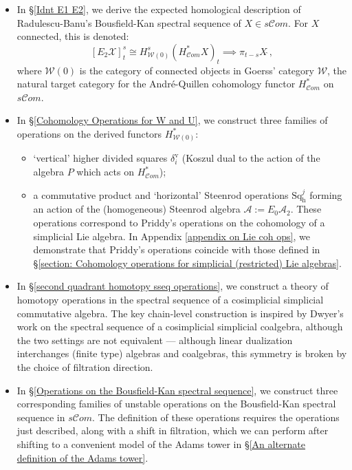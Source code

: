 \documentclass[11pt]{amsart} \renewcommand{\baselinestretch}{1.4}
\theoremstyle{plain}
\theoremstyle{definition}
\newcommand{\scrC}{\mathscr{C}}
\newcommand{\calA}{\mathcal{A}}
\newcommand{\calw}{\mathcal{W}}
\newcommand{\cala}{\mathcal{A}}
\newcommand{\calx}{\mathcal{X}}
\newcommand{\LieSteen}{\calA}
\newcommand{\algs}{{\scrC\!\textit{om}}}
\newcommand{\E}[5]{[E^{#1}_{#2}#3]^{#4}_{#5}}
\newcommand{\uver}{^\mathrm{v}}
\newcommand{\dhor}{_\mathrm{h}}
\newcommand{\Sqh}{\mathrm{Sq}\dhor}
\newcommand{\deltav}{\delta\uver}
\begin{document}
\begin{Introduction}
\begin{itemize}
\item In \S\ref{Idnt E1 E2}, we derive the expected homological description of Radulescu-Banu's Bousfield-Kan spectral sequence of $X\in s\algs$. For $X$ connected, this is denoted:
\[\E{}{2}{\calx}{s}{t}\cong H^{s}_{\calw(0)}(H^{*}_{\algs}X)_t\implies \pi_{t-s}X\hat{\ },\]
where $\calw(0)$ is the category of connected objects in Goerss' category $\calw$, the natural target category for the Andr\'e-Quillen cohomology functor $H^*_\algs$ on $s\algs$.
\item In \S\ref{Cohomology Operations for W and U}, we construct three families of operations on the derived functors $H^*_{\calw(0)}$:
\begin{itemize}
\item `vertical' higher divided squares $\deltav_i$ (Koszul dual to the action of the algebra $P$ which acts on $H^*_{\algs}$);
\item a commutative product and `horizontal' Steenrod operations $\Sqh^j$ forming an action of the (homogeneous) Steenrod algebra $\LieSteen:=E_0\cala_2$.  These operations correspond to Priddy's operations \cite{PriddySimplicialLie.pdf} on the cohomology of a simplicial Lie algebra. In Appendix \ref{appendix on Lie coh ops}, we demonstrate that Priddy's operations coincide with those defined in \S\ref{section: Cohomology operations for simplicial (restricted) Lie algebras}.
\end{itemize}
\item In \S\ref{second quadrant homotopy sseq operations}, we construct a theory of homotopy operations in the spectral sequence of a cosimplicial simplicial commutative algebra. The key chain-level construction is inspired by Dwyer's work \cite{DwyerHigherDividedSquares.pdf} on the spectral sequence of a cosimplicial simplicial coalgebra, although the two settings are not equivalent  --- although linear dualization interchanges (finite type) algebras and coalgebras, this symmetry is broken by the choice of filtration direction.
\item In \S\ref{Operations on the Bousfield-Kan spectral sequence}, we construct three corresponding families of unstable operations on the Bousfield-Kan spectral sequence in $s\algs$. The definition of these operations requires the operations just described, along with a shift in filtration, which we can perform after shifting to a convenient model of the Adams tower in \S\ref{An alternate definition of the Adams tower}.

\end{itemize}
\end{Introduction}
\end{document}
